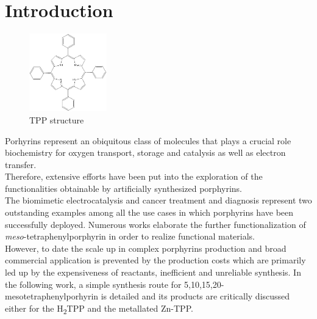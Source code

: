 \documentclass[num-refs]{wiley-article}
\begin{document}
\section{Introduction}
\begin{figure}
    \includegraphics[width=0.3\textwidth]{TPP}
    \caption{TPP structure}
    \label{TPP-structure}
\end{figure}
Porhyrins represent an obiquitous class of molecules that plays a crucial role biochemistry for oxygen transport\citep{hardison_evolution_2012}, storage\citep{kendrew_three-dimensional_1958} and catalysis as well as electron transfer\citep{keilin_cytochrome_1925}.\\
Therefore, extensive efforts have been put into the exploration of the functionalities obtainable by artificially synthesized porphyrins.\\
The biomimetic electrocatalysis\cite{facchin_oxygen_2021,liang_porphyrin-based_2021} and cancer treatment and diagnosis\cite{wang_recent_2021} represent two outstanding examples among all the use cases in which porphyrins have been successfully deployed.
Numerous works elaborate the further functionalization of \textit{meso}-tetraphenylporphyrin\cite{silva_porphyrins_2006} in order to realize functional materials. \\
However, to date the scale up in complex porphyrins production and broad commercial application is prevented by the production costs which are primarily led up by the expensiveness of reactants, inefficient and unreliable synthesis.
In the following work, a simple synthesis route for 5,10,15,20-mesotetraphenylporhyrin is detailed and its products are critically discussed either for the \texorpdfstring{H\textsubscript{2}}-TPP and the metallated Zn-TPP.

\newpage

\twocolumn
\end{document}
